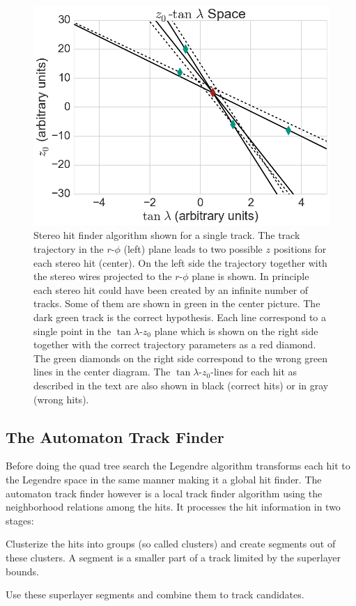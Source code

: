 \begin{figure}
 \vspace*{1cm}
 \includegraphics[scale=0.3]{figures/theory/stereo_3.png}
 \caption[Stereo Legendre algorithm.]{Stereo hit finder algorithm shown for a single track. The track trajectory in the $r$-$\phi$ (left) plane leads to two possible $z$ positions for each stereo hit (center). On the left side the trajectory together with the stereo wires projected to the $r$-$\phi$ plane is shown. In principle each stereo hit could have been created by an infinite number of tracks. Some of them are shown in green in the center picture. The dark green track is the correct hypothesis. Each line correspond to a single point in the $\tan \lambda$-$z_0$ plane which is shown on the right side together with the correct trajectory parameters as a red diamond. The green diamonds on the right side correspond to the wrong green lines in the center diagram. The $\tan \lambda$-$z_0$-lines for each hit as described in the text are also shown in black (correct hits) or in gray (wrong hits).}
 \label{fig-stereo-explained}
\end{figure}


\subsection{The Automaton Track Finder}
Before doing the quad tree search the Legendre algorithm transforms each hit to the Legendre space in the same manner making it a global hit finder. The automaton track finder however is a local track finder algorithm using the neighborhood relations among the hits. It processes the hit information in two stages:
\begin{zlist}
  \item Clusterize the hits into groups (so called clusters) and create segments out of these clusters. A segment is a smaller part of a track limited by the superlayer bounds. 
  \item Use these superlayer segments and combine them to track candidates.
\end{zlist}

